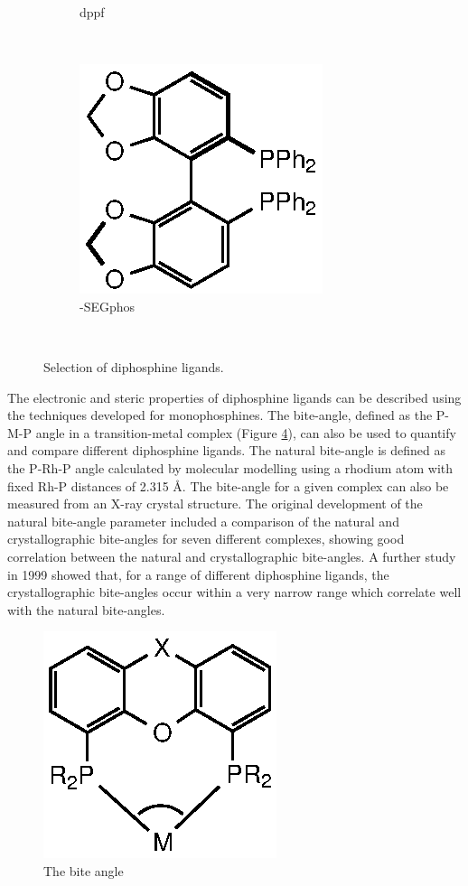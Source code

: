 \begin{figure}[htbp]
\begin{subfigure}[b]{0.3\textwidth}
	\caption{dppf}
	\label{dppf}
\end{subfigure}
~
\begin{subfigure}[b]{0.3\textwidth}
	\centering
	\includegraphics{../Figures/Diphosphines/SEGphos.eps}
	\caption{\rectus{}-SEGphos}
	\label{SEGphos}
\end{subfigure}
\\
\caption[Selection of diphosphine ligands]{Selection of diphosphine ligands.}
\label{diphosphineligands}
\end{figure}

The electronic and steric properties of diphosphine ligands can be described using the techniques developed for monophosphines.\cite{Tolman1977, Banger2009, Dunne1991, Roodt2003, Mann1980, Tiburcio2006, Tolman1970}  The bite-angle, defined as the P-M-P angle in a transition-metal complex (Figure \ref{Biteangle}), can also be used to quantify and compare different diphosphine ligands.  The natural bite-angle is defined as the P-Rh-P angle calculated by molecular modelling using a rhodium atom with fixed Rh-P distances of 2.315 \si{\angstrom}.\cite{Casey1990}  The bite-angle for a given complex can also be measured from an X-ray crystal structure.  The original development of the natural bite-angle parameter included a comparison of the natural and crystallographic bite-angles for seven different complexes, showing good correlation between the natural and crystallographic bite-angles.\cite{Casey1990}  A further study in 1999 showed that, for a range of different diphosphine ligands, the crystallographic bite-angles occur within a very narrow range which correlate well with the natural bite-angles.\cite{Dierkes1999}

\begin{figure}[ht]
\centering
\includegraphics[]{../Figures/Biteangle.eps}
\caption[The bite angle]{The bite angle}
\label{Biteangle}
\end{figure}

